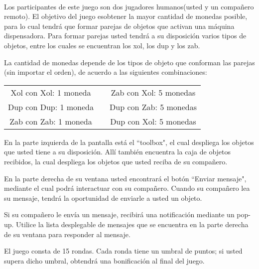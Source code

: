 \documentclass{article}
\begin{document}
\ \\

\begin{multicols}{2}{
\noindent Los participantes de este juego son dos jugadores humanos\linebreak (usted y un compañero remoto). El objetivo del juego es\linebreak obtener la mayor cantidad de monedas posible, para lo cual tendrá que formar parejas de objetos que activan una máquina dispensadora. Para formar parejas usted tendrá a su disposición varios tipos de objetos, entre los cuales se encuentran los xol, los dup y los zab. 

\vspace{0.5\baselineskip}

\noindent La cantidad de monedas depende de los tipos de objeto que conforman las parejas (sin importar el orden), de acuerdo a las siguientes combinaciones:

\vspace{-0.25\baselineskip}

\begin{tabular}{ccc}\\
Xol con Xol: 1 moneda && Zab con Xol: 5 monedas\\
Dup con Dup: 1 moneda && Dup con Zab: 5 monedas\\
Zab con Zab: 1 moneda && Dup con Xol: 5 monedas
\end{tabular}

\vspace{0.5\baselineskip}

\noindent En la parte izquierda de la pantalla está el ``toolbox", el cual despliega los objetos que usted tiene a su disposición. Allí también encuentra la caja de objetos recibidos, la cual despliega los objetos que usted reciba de su compañero.

\vspace{0.5\baselineskip}

\noindent En la parte derecha de su ventana usted encontrará el botón ``Enviar mensaje", mediante el cual podrá interactuar con su compañero. Cuando su compañero lea su mensaje, tendrá la oportunidad de enviarle a usted un objeto. 

\vspace{0.5\baselineskip}

\noindent Si su compañero le envía un mensaje, recibirá una notificación mediante un pop-up. Utilice la lista desplegable de mensajes que se encuentra en la parte derecha de su ventana para responder al mensaje.

\vspace{0.5\baselineskip}

\noindent El juego consta de 15 rondas. Cada ronda tiene un umbral de puntos; si usted supera dicho umbral, obtendrá una bonificación al final del juego.
}\end{multicols}
\end{document}
